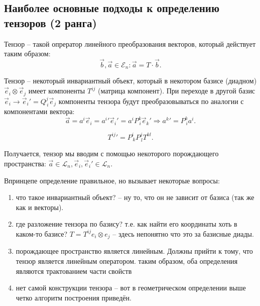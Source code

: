 \subsection{Наиболее основные подходы к определению тензоров (2 ранга)}

\begin{definition}
  Тензор -- такой опрератор линейного преобразования векторов, который действует таким образом:
  \[
    \vec{b}, \vec{a} \in \mathcal{E}_n : \vec{a} = T \cdot \vec{b}.
  \]
\end{definition}

\begin{definition}
  Тензор -- некоторый инвариантный объект, который в некотором базисе (диадном) $\vec{e}_i \otimes \vec{e}_j$ имеет компоненты $T^{ij}$ (матрица компонент).
  При переходе в другой базис $\vec{e}_i \to \vec{e}_i' = Q^j_{\, i} \vec{e}_j$ компоненты тензора
  будут преобразовываться по аналогии с компонентами вектора:
  \[
    \vec{a} = a^i \vec{e}_i = {a^i}' {\vec{e}_i}' = a^i P^k_{\,i} \vec{e}_k'
    \Rightarrow
    {a^k}' = P^k_{\, i} a^i.
  \]

  \[
    {T^{ij}}' = P^i_{\, k} P^j_{\, l} T^{kl}.
  \]

\end{definition}

Получается, тензор мы вводим с помощью некоторого порождающего пространства:
$\vec{a} \in \mathcal{L}_n, \vec{e}_i, \vec{e}_i' \in \mathcal{L}_n$.

Впринцепе определение правильное, но вызывает некоторые вопросы:
\begin{enumerate}
  \item что такое инвариантный объект? -- ну то, что он не зависит от базиса (так же как и векторы).

  \item где разложение тензора по базису? т.е. как найти его координаты хоть в каком-то базисе? 
    $T = T^{ij} e_i \otimes e_j$ -- здесь непонятно что это за базисные диады.

  \item порождающее пространство является линейным. Должны прийти к тому, что тензор является
    линейным оператором. таким образом, оба определения являются трактованием части свойств
    
    \begin{figure}[H]
    	\centering
    	
    \end{figure}

  \item нет самой конструкции тензора -- вот в геометрическом определении выше четко алгоритм 
    построения приведён.
\end{enumerate}

